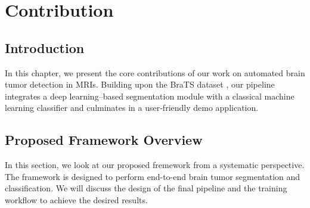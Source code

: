 \chapter{Contribution}

\section{Introduction}
\label{sec:contribution-introduction}

In this chapter, we present the core contributions of our work on automated brain tumor detection in MRIs. Building upon the BraTS dataset \cite{Menze2015}, our pipeline integrates a deep learning–based segmentation module with a classical machine learning classifier and culminates in a user‐friendly demo application.


\section{Proposed Framework Overview}
\label{sec:contribution-framework}
In this section, we look at our proposed fremework from a systematic perspective. The framework is designed to perform end-to-end brain tumor segmentation and classification. We will discuss the design of the final pipeline and the training workflow to achieve the desired results.

